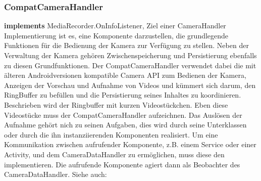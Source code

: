 \subsubsection{CompatCameraHandler} \label{app:klasse:CompatCameraHandler}
\textbf{implements} MediaRecorder.OnInfoListener,  \newline
Ziel einer CameraHandler Implementierung ist es, eine Komponente darzustellen, die grundlegende Funktionen für die Bedienung der Kamera zur Verfügung zu stellen. Neben der Verwaltung der Kamera gehören Zwischenspeicherung und Persistierung ebenfalls zu diesen Grundfunktionen. Der CompatCameraHandler verwendet dabei die mit älteren Androidversionen kompatible Camera API zum Bedienen der Kamera, Anzeigen der Vorschau und Aufnahme von Videos und kümmert sich darum, den RingBuffer zu befüllen und die Persistierung seines Inhaltes zu koordinieren. Beschrieben wird der Ringbuffer mit kurzen Videostückchen. Eben diese Videostücke muss der CompatCameraHandler aufzeichnen.
Das Auslösen der Aufnahme gehört nich zu seinen Aufgaben, dies wird durch seine Unterklassen oder durch die ihn instanziierenden Komponenten realisiert. Um eine Kommunikation zwischen aufrufender Komponente, z.B. einem Service oder einer Activity, und dem CameraDataHandler zu ermöglichen, muss diese den  implementieren. Die aufrufende Komponente agiert dann als Beobachter des CameraDataHandler.
\newline
Siehe auch: 

